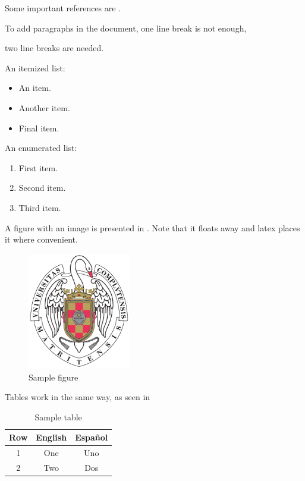 		Some important references are \cite{einstein,latexcompanion,knuthwebsite}.

		To add paragraphs in the document, 
		one line break is not enough,

		two line breaks are needed.

		An itemized list:

		\begin{itemize}
			\item An item.
			\item Another item.
			\item Final item.
		\end{itemize}

		An enumerated list:

		\begin{enumerate}
			\item First item.
			\item Second item.
			\item Third item.
		\end{enumerate}

		A figure with an image is presented in . Note that it floats away and latex places it where convenient.

		\begin{figure}[h!]
			\centering
			\includegraphics[width=0.4\textwidth]{./Images/escudo_ucm.pdf}
			\caption{Sample figure}
			\label{fig:logo_ucm}
		\end{figure}

		Tables work in the same way, as seen in 

		\begin{table}[h!]
			\centering
			\begin{tabular}{c|c|c}
				Row & English & Español \\\hline\hline
				1 & One & Uno \\
				2 & Two & Dos \\
			\end{tabular}
			\caption{Sample table}
			\label{tab:tabla}
		\end{table}
	\blindtext